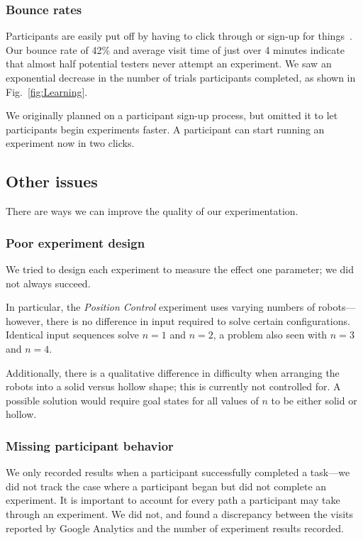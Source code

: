 \subsubsection{Bounce rates}
Participants are easily put off by having to click through or sign-up for things~\cite{krug2009don}.  Our bounce rate of 42\% and average visit time of just over 4 minutes indicate that almost half potential testers never attempt an experiment. We saw an exponential decrease in the number of trials participants completed, as shown in Fig.~\ref{fig:Learning}.

We originally planned on a participant sign-up process, but omitted it to let participants begin experiments faster. A participant can start running an experiment now in two clicks.


\subsection{Other issues}

There are ways we can improve the quality of our experimentation.

\subsubsection{Poor experiment design}

We tried to design each experiment to measure the effect one parameter; we did not always succeed.

In particular, the \emph{Position Control} experiment uses varying numbers of robots---however, there is no difference in input required to solve certain configurations. Identical input sequences solve $n=1$ and $n=2$, a problem also seen with $n=3$ and $n=4$.

Additionally, there is a qualitative difference in difficulty when arranging the robots into a solid versus hollow shape; this is currently not controlled for. A possible solution would require goal states for all values of $n$ to be either solid or hollow.

\subsubsection{Missing participant behavior}

We only recorded results when a participant successfully completed a task---we did not track the case where a participant began but did not complete an experiment. It is important to account for every path a participant may take through an experiment. We did not, and found a discrepancy between the visits reported by Google Analytics and the number of experiment results recorded.
